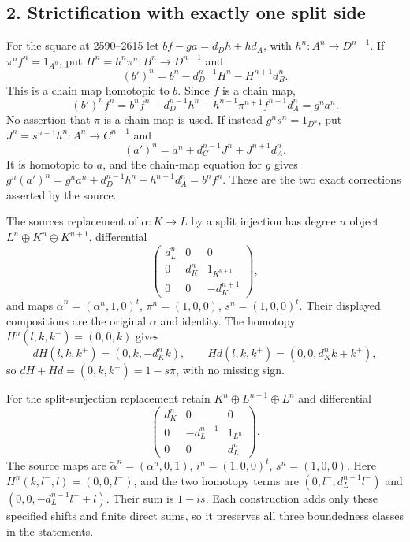 \subsection{2. Strictification with exactly one split side}\label{proofs-2419-2994-strictification-with-exactly-one-split-side}

For the square at 2590–\allowbreak{}2615 let \(bf-ga=d_Dh+hd_A\),\allowbreak{} with \(h^n:A^n\to D^{n-1}\). If \(\pi^nf^n=1_{A^n}\),\allowbreak{} put \(H^n=h^n\pi^n:B^n\to D^{n-1}\) and \[
(b')^n=b^n-d_D^{n-1}H^n-H^{n+1}d_B^n.
\] This is a chain map homotopic to \(b\). Since \(f\) is a chain map,\allowbreak{} \[
(b')^nf^n=b^nf^n-d_D^{n-1}h^n
-h^{n+1}\pi^{n+1}f^{n+1}d_A^n=g^na^n.
\] No assertion that \(\pi\) is a chain map is used. If instead \(g^ns^n=1_{D^n}\),\allowbreak{} put \(J^n=s^{n-1}h^n:A^n\to C^{n-1}\) and \[
(a')^n=a^n+d_C^{n-1}J^n+J^{n+1}d_A^n.
\] It is homotopic to \(a\),\allowbreak{} and the chain-map equation for \(g\) gives \(g^n(a')^n=g^na^n+d_D^{n-1}h^n+h^{n+1}d_A^n=b^nf^n\). These are the two exact corrections asserted by the source.

The source\textquotesingle s replacement of \(\alpha:K\to L\) by a split injection has degree \(n\) object \(L^n\oplus K^n\oplus K^{n+1}\),\allowbreak{} differential \[
\begin{pmatrix}d_L^n&0&0\\0&d_K^n&1_{K^{n+1}}\\
0&0&-d_K^{n+1}\end{pmatrix},
\] and maps \(\widetilde\alpha^n=(\alpha^n,1,0)^t\),\allowbreak{} \(\pi^n=(1,0,0)\),\allowbreak{} \(s^n=(1,0,0)^t\). Their displayed compositions are the original \(\alpha\) and identity. The homotopy \(H^n(l,k,k^+)=(0,0,k)\) gives \[
dH(l,k,k^+)=(0,k,-d_K^nk),\qquad
Hd(l,k,k^+)=(0,0,d_K^nk+k^+),
\] so \(dH+Hd=(0,k,k^+)=1-s\pi\),\allowbreak{} with no missing sign.

For the split-surjection replacement retain \(K^n\oplus L^{n-1}\oplus L^n\) and differential \[
\begin{pmatrix}d_K^n&0&0\\0&-d_L^{n-1}&1_{L^n}\\
0&0&d_L^n\end{pmatrix}.
\] The source maps are \(\widetilde\alpha^n=(\alpha^n,0,1)\),\allowbreak{} \(i^n=(1,0,0)^t\),\allowbreak{} \(s^n=(1,0,0)\). Here \(H^n(k,l^-,l)=(0,0,l^-)\),\allowbreak{} and the two homotopy terms are \((0,l^-,d_L^{n-1}l^-)\) and \((0,0,-d_L^{n-1}l^-+l)\). Their sum is \(1-is\). Each construction adds only these specified shifts and finite direct sums,\allowbreak{} so it preserves all three boundedness classes in the statements.

